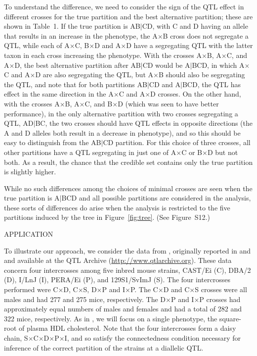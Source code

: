 \documentclass[12pt,letterpaper]{article}
\begin{document}
To understand the difference, we need to consider the
sign of the QTL effect in different crosses for the true partition and
the best alternative partition; these are shown in Table~1.  If the
true partition is AB$|$CD, with C and D having an allele that results
in an increase in the phenotype, the A$\times$B cross does not
segregate a QTL, while each of A$\times$C, B$\times$D and A$\times$D
have a segregating QTL with the latter taxon in each cross increasing
the phenotype.  With the crosses A$\times$B,
A$\times$C, and A$\times$D, the best alternative partition after AB$|$CD would be
A$|$BCD, in which A$\times$C and A$\times$D are also segregating the
QTL, but A$\times$B should also be segregating the QTL, and note that
for both partitions AB$|$CD and A$|$BCD, the QTL has effect in the
same direction in the A$\times$C and A$\times$D crosses.  On the other
hand, with the crosses A$\times$B,
A$\times$C, and B$\times$D (which was seen to have better
performance), in the only alternative partition with two crosses
segregating a QTL, AD$|$BC, the two crosses should have QTL effects in
opposite directions (the A and D alleles both result in a decrease in
phenotype), and so this should be easy to distinguish from the AB$|$CD
partition.  For this choice of three crosses, all other partitions
have a QTL segregating in just one of A$\times$C or B$\times$D but
not both.  As a result, the chance that the credible set contains only
the true partition is slightly higher. 

While no such differences among the choices of minimal crosses are
seen when the true partition is A$|$BCD and all possible partitions
are considered in the analysis, these sorts of differences do arise
when the analysis is restricted to the five partitions induced by the
tree in Figure~\ref{fig:tree}.  (See Figure~S12.)


\clearpage

\centerline{APPLICATION}

To illustrate our approach, we consider the data from \citet{Li2005},
originally reported in \citet{Lyons1, Lyons2, Lyons3} and
\citet{Wittenburg1, Wittenburg2} and available at the QTL Archive
(\url{http://www.qtlarchive.org}).  These data concern four
intercrosses among five inbred mouse strains, CAST/Ei (C), DBA/2 (D),
I/LnJ (I), PERA/Ei (P), and 129S1/SvImJ (S).  The four intercrosses
performed were C$\times$D, C$\times$S, D$\times$P and I$\times$P.  The
C$\times$D and C$\times$S crosses were all males and had 277 and 275
mice, respectively. The D$\times$P and I$\times$P crosses had
approximately equal numbers of males and females and had a total of
282 and 322 mice, respectively.  As in \citet{Li2005}, we will focus
on a single phenotype, the square-root of plasma HDL cholesterol.
Note that the four intercrosses form a daisy chain,
S$\times$C$\times$D$\times$P$\times$I, and so satisfy the
connectedness condition necessary for inference of the correct
partition of the strains at a diallelic QTL.  
\end{document}
